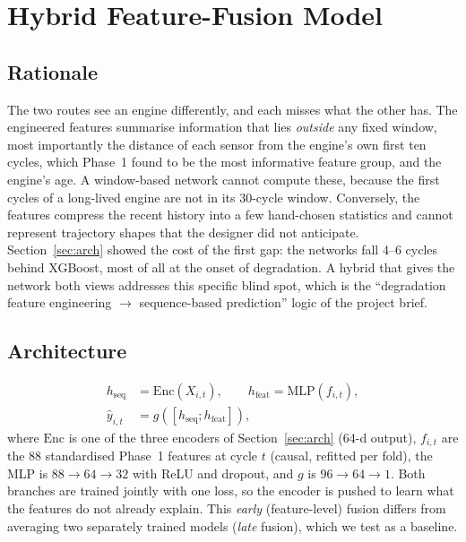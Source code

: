 \section{Hybrid Feature-Fusion Model}\label{sec:hybrid}
\subsection{Rationale}
The two routes see an engine differently, and each misses what the other has. The engineered features summarise information that lies \emph{outside} any fixed window, most importantly the distance of each sensor from the engine's own first ten cycles, which Phase~1 found to be the most informative feature group, and the engine's age. A window-based network cannot compute these, because the first cycles of a long-lived engine are not in its 30-cycle window. Conversely, the features compress the recent history into a few hand-chosen statistics and cannot represent trajectory shapes that the designer did not anticipate. Section~\ref{sec:arch} showed the cost of the first gap: the networks fall 4--6 cycles behind XGBoost, most of all at the onset of degradation. A hybrid that gives the network both views addresses this specific blind spot, which is the ``degradation feature engineering $\rightarrow$ sequence-based prediction'' logic of the project brief.

\subsection{Architecture}
\begin{equation}
\begin{aligned}
h_{\text{seq}}&=\mathrm{Enc}(X_{i,t}),\qquad h_{\text{feat}}=\mathrm{MLP}(f_{i,t}),\\
\hat y_{i,t}&=g\!\left([h_{\text{seq}};h_{\text{feat}}]\right),
\end{aligned}
\end{equation}
where $\mathrm{Enc}$ is one of the three encoders of Section~\ref{sec:arch} (64-d output), $f_{i,t}$ are the 88 standardised Phase~1 features at cycle $t$ (causal, refitted per fold), the MLP is $88\rightarrow64\rightarrow32$ with ReLU and dropout, and $g$ is $96\rightarrow64\rightarrow1$. Both branches are trained jointly with one loss, so the encoder is pushed to learn what the features do not already explain. This \emph{early} (feature-level) fusion differs from averaging two separately trained models (\emph{late} fusion), which we test as a baseline.

